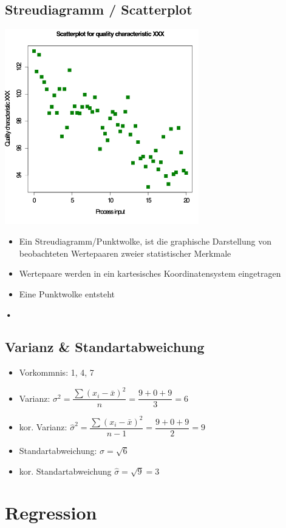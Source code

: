 \documentclass[8pt,a4paper]{scrartcl}
\begin{document}
\begin{multicols*}{3}
		\subsection{Streudiagramm / Scatterplot} 
			\includegraphics[height=8.5cm]{img/scatter.png}
				\begin{itemize}\itemsep0pt				
					\item Ein Streudiagramm/Punktwolke, ist die graphische Darstellung von beobachteten Wertepaaren zweier statistischer Merkmale
					\item Wertepaare werden in ein kartesisches Koordinatensystem eingetragen
					\item Eine Punktwolke entsteht
				\end{itemize}	
			\textbf{•}
			
		\subsection{Varianz \& Standartabweichung}  
			\begin{itemize}\itemsep0pt				
				\item Vorkommnis: 1, 4, 7
				\item Varianz: $\sigma^{2} =  \dfrac{\sum(x_{i} -\bar{x})^{2}}{n} = \dfrac{9+0+9}{3} = 6$
				\item kor. Varianz: $\hat{\sigma}^{2} = \dfrac{\sum(x_{i} -\bar{x})^{2}}{n-1} = \dfrac{9+0+9}{2} = 9$
				\item Standartabweichung: $\sigma = \sqrt{6}$
				\item kor. Standartabweichung $\hat{\sigma} = \sqrt{9} = 3$
			\end{itemize}
		\section{Regression}

\end{multicols*}
\end{document}
